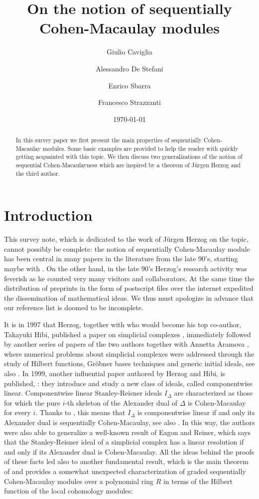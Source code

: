 \documentclass[12pt]{amsart}
\title{On the notion of sequentially Cohen-Macaulay modules}
\author[G. Caviglia]{Giulio Caviglia}
\author[A. De Stefani]{Alessandro De Stefani}
\author[E. Sbarra]{Enrico Sbarra}
\author[F. Strazzanti]{Francesco Strazzanti}
\date{\today}
\theoremstyle{definition}
\theoremstyle{definition}
\begin{document}

\begin{abstract}
In this survey paper we first present the main properties of sequentially Cohen-Macaulay modules. Some  basic examples are provided to help the reader with quickly getting acquainted with this topic.
We then discuss two generalizations of the notion of sequential Cohen-Macaulayness which are inspired by a theorem of J\"urgen Herzog and the third author. 
\end{abstract}


\maketitle


\section*{Introduction} 
This survey note, which is dedicated to the work of J\"urgen Herzog on the topic, cannot possibly be complete: the notion of sequentially Cohen-Macaulay module has been central in many papers in the literature from the late 90's, starting maybe with \cite{D96}. On the other hand, in the late 90's Herzog's research activity was feverish as he counted very many visitors and collaborators. At the same time the distribution of preprints in the form of postscript files over the internet expedited the dissemination of mathematical ideas. We thus must apologize in advance that our reference list is doomed to be incomplete.

It is in 1997 that Herzog, together with who would become his top co-author, Takayuki Hibi, published a paper on simplicial complexes \cite{HH97}, immediately followed by another series of papers of the two authors together with Annetta Aramova \cite{AHH97, AHH97-2, AHH98}, where numerical problems about simplicial complexes were addressed through the study of Hilbert functions, Gr\"obner bases techniques and generic initial ideals, see also \cite{ADH98, AH97, DH98}. In 1999, another influential paper authored by Herzog and Hibi, is published, \cite{HH99}: they introduce and study a new class of ideals, called componentwise linear. 
Componentwise linear Stanley-Reisner ideals $I_\Delta$ are characterized as those for which the pure $i$-th skeleton of the Alexander dual of $\Delta$ is Cohen-Macaulay for every $i$.
Thanks to \cite{D96}, this means that $I_\Delta$  is componentwise linear if and only its  Alexander dual is sequentially Cohen-Macaulay, see also \cite{HRW99}.
In this way, the authors were also able to generalize a well-known result of Eagon and Reiner, which says that the Stanley-Reisner ideal of a simplicial complex has a linear resolution if and only if its Alexander dual is Cohen-Macaulay. 
All the ideas behind the proofs of these facts led also to another fundamental result, which is the main theorem of \cite{HS01} and provides a somewhat unexpected characterization of graded sequentially Cohen-Macaulay modules over a polynomial ring $R$ in terms of the Hilbert function of the local cohomology modules: 
\end{document}
